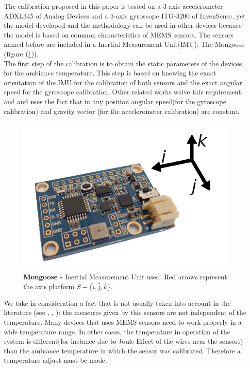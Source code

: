 \documentclass[conference]{IEEEtran}
\newcommand{\refp}[1]{(\ref{#1})}
\begin{document}
The calibration proposed in this paper is tested on a 3-axis accelerometer ADXL345 of Analog Devices and a 3-axis gyroscope ITG-3200  of InvenSense, yet the model developed and the methodology can be used in other devices because the model is based on common characteristics of MEMS sensors. The sensors named before are included in a Inertial Measurement Unit(IMU): The Mongoose (figure \refp{fig:mongoose}). \\


The first step of the calibration is to obtain the static parameters of the devices for the ambiance temperature. This step is based on knowing the exact orientation of the IMU for the calibration of both sensors and the exact angular speed for the gyroscope calibration. Other related works waive this requirement\cite{bib:calib_imu} and \cite{bib:kalman} and uses the fact that in any position angular speed(for the gyroscope calibration) and gravity vector (for the accelerometer calibration) are constant.\\

\begin{figure}[h]
	\centering
	\includegraphics[width=.6\columnwidth]{./pics_paper/mongoose.png}
	\caption{\textbf{Mongoose -} Inertial Measurement Unit used. Red arrows represent the axis platform $S - \{\hat{i}, \hat{j}, \hat{k} \}$. }
	\label{fig:mongoose}
\end{figure}

We take in consideration a fact that is not usually taken into account in the literature (see \cite{bib:calib_imu}, \cite{bib:kalman}, \cite{bib:calib_imu_dos}): the measures given by this sensors are not independent of the temperature. Many devices that uses MEMS sensors need to work properly in a wide temperature range. In other cases, the temperature in operation of the system is different(for instance due to Joule Effect of the wires near the sensors) than the ambiance temperature in which the sensor was calibrated. Therefore a temperature adjust must be made.
   
\end{document}
